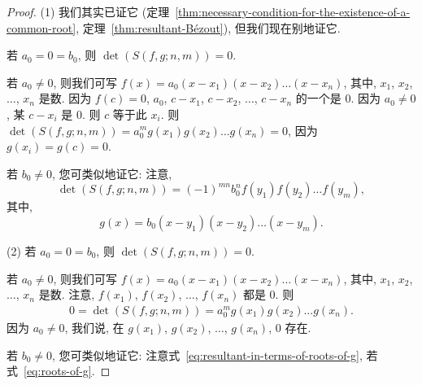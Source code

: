 \documentclass[../libro.tex]{subfiles}
\begin{document}
\begin{proof}
    (1)
    我们其实已证它
    (定理~\ref{thm:necessary-condition-for-the-existence-of-a-common-root},
    定理~\ref{thm:resultant-Bézout}),
    但我们现在别地证它.

    若 \(a_0 = 0 = b_0\), 则 \(\det {(S(f, g; n, m))} = 0\).

    若 \(a_0 \neq 0\), 则我们可写
    \(f(x) = a_0 (x - x_1) (x - x_2) \dots (x - x_n)\),
    其中, \(x_1\), \(x_2\), \(\dots\), \(x_n\) 是数.
    因为 \(f(c) = 0\),
    \(a_0\), \(c - x_1\), \(c - x_2\), \(\dots\), \(c - x_n\)
    的一个是 \(0\).
    因为 \(a_0 \neq 0\),
    某 \(c - x_i\) 是 \(0\).
    则 \(c\) 等于此 \(x_i\).
    则
    \(\det {(S(f, g; n, m))}
    = a_0^m g(x_1) g(x_2) \dots g(x_n) = 0\),
    因为 \(g(x_i) = g(c) = 0\).

    若 \(b_0 \neq 0\), 您可类似地证它:
    注意,
    \begin{equation}
        \det {(S(f, g; n, m))}
        = (-1)^{m n} b_0^n f(y_1) f(y_2) \dots f(y_m),
        \label{eq:resultant-in-terms-of-roots-of-g}
    \end{equation}
    其中,
    \begin{equation}
        g(x) = b_0 (x - y_1) (x - y_2) \dots (x - y_m).
        \label{eq:roots-of-g}
    \end{equation}

    (2)
    若 \(a_0 = 0 = b_0\), 则 \(\det {(S(f, g; n, m))} = 0\).

    若 \(a_0 \neq 0\), 则我们可写
    \(f(x) = a_0 (x - x_1) (x - x_2) \dots (x - x_n)\),
    其中, \(x_1\), \(x_2\), \(\dots\), \(x_n\) 是数.
    注意,
    \(f(x_1)\), \(f(x_2)\), \(\dots\), \(f(x_n)\) 都是 \(0\).
    则
    \begin{align*}
        0
        = \det {(S(f, g; n, m))}
        = a_0^m g(x_1) g(x_2) \dots g(x_n).
    \end{align*}
    因为 \(a_0 \neq 0\),
    我们说,
    在 \(g(x_1)\), \(g(x_2)\), \(\dots\), \(g(x_n)\),
    \(0\) 存在.

    若 \(b_0 \neq 0\), 您可类似地证它:
    注意式~\eqref{eq:resultant-in-terms-of-roots-of-g},
    若式~\eqref{eq:roots-of-g}.
\end{proof}
\end{document}
